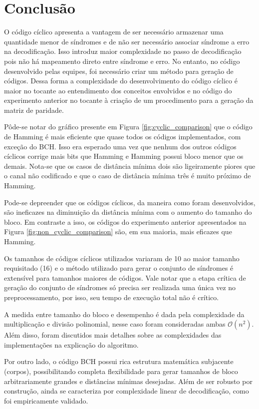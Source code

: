 \section{Conclusão}
 O código cíclico apresenta a vantagem de ser necessário armazenar uma quantidade menor de síndromes e de não ser necessário associar síndrome a erro na decodificação. Isso introduz maior complexidade no passo de decodificação pois não há mapeamento direto entre síndrome e erro. No entanto, no código desenvolvido pelas equipes, foi necessário criar um método para geração de códigos. Dessa forma a complexidade do desenvolvimento do código cíclico é maior no tocante ao entendimento dos conceitos envolvidos e no código do experimento anterior no tocante à criação de um procedimento para a geração da matriz de paridade.
 
 Pôde-se notar do gráfico presente em Figura \ref{fig:cyclic_comparison} que o código de Hamming é mais eficiente que quase todos os códigos implementados, com exceção do BCH. Isso era esperado uma vez que nenhum dos outros códigos cíclicos corrige mais bits que Hamming e Hamming possui bloco menor que os demais. Nota-se que os casos de distância mínima dois são ligeiramente piores que o canal não codificado e que o caso de distância mínima três é muito próximo de Hamming.
 
 Pode-se depreender que os códigos cíclicos, da maneira como foram desenvolvidos, são ineficazes na diminuição da distância mínima com o aumento do tamanho do bloco. Em contraste a isso, os códigos do experimento anterior apresentados na Figura \ref{fig:non_cyclic_comparison} são, em sua maioria, mais eficazes que Hamming.
 
 Os tamanhos de códigos cíclicos utilizados variaram de 10 ao maior tamanho requisitado (16) e o método utilizado para gerar o conjunto de síndromes é extensível para tamanhos maiores de códigos. Vale notar que a etapa crítica de geração do conjunto de síndromes só precisa ser realizada uma única vez no preprocessamento, por isso, seu tempo de execução total não é crítico.
 
 A medida entre tamanho do bloco e desempenho é dada pela complexidade da multiplicação e divisão polinomial, nesse caso foram consideradas ambas $\mathcal{O}(n^2)$. Além disso, foram discutidos mais detalhes sobre as complexidades das implementações na explicação do algoritmo.

 Por outro lado, o código BCH possui rica estrutura matemática subjacente (corpos), possibilitando completa flexibilidade para gerar tamanhos de bloco arbitrariamente grandes e distâncias mínimas desejadas. Além de ser robusto por construção, ainda se caracteriza por complexidade linear de decodificação, como foi empiricamente validado.